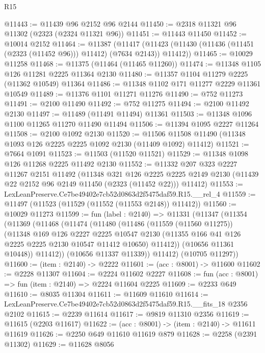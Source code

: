 \begin{lexlean}{R15}
\begin{coremodule}
@11443 := @11439 @96 @2152 @96 @2144
@11450 := @2318 @11321 @96 @11302 (@2323 (@2324 @11321 @96))
@11451 := @11443 @11450
@11452 := @10014 @2152
@11464 := @11387
    (@11417 (@11423 (@11430 (@11436 (@11451 (@2323 (@11452 @96))) @11412) (@7634 @2143)) @11412))
@11465 := @10029 @11258
@11468 := @11375 (@11464 (@11465 @11260))
@11474 := @11348 @1105 @126 @11281 @2225 @11364 @2130
@11480 := @11357 @1104 @11279 @2225 (@11362 @10549) @11364
@11486 := @11348 @1102 @171 @11277 @2229 @11361 @10549
@11489 := @11376 @1101 @11271 @11276
@11490 := @752 @11273
@11491 := @2100 @11490
@11492 := @752 @11275
@11494 := @2100 @11492 @2130
@11497 := @11489 (@11491 @11494) @11361
@11503 := @11348 @1096 @1100 @11265 @11270 @11490 @11494
@11506 := @11394 @1095 @2227 @11264
@11508 := @2100 @1092 @2130
@11520 := @11506 @11508 @11490 (@11348 @1093 @126 @2225 @2225 @1092 @2130 (@11409 @1092) @11412)
@11521 := @7664 @1091
@11523 := @11503 (@11520 @11521)
@11529 := @11348 @1098 @126 @11268 @2225 @11492 @2130
@11552 := @11332
    @207
    @323
    @2227
    @11267
    @2151
    @11492
    (@11348
      @321
      @126
      @2225
      @2225
      @2149
      @2130
      (@11439 @22 @2152 @96 @2149 @11450 (@2323 (@11452 @22)))
      @11412)
@11553 := LexLeanPreserve.Ce7be49402e7cb52d0863d2f5475daf59.R15.__rel_4
@11559 := @11497 (@11523 (@11529 (@11552 (@11553 @2148)) @11412))
@11560 := @10029 @11273
@11599 := fun (label : @2140) =>
  @11331
    (@11347
      (@11354
        (@11369
          (@11468
            (@11474
              (@11480
                (@11486
                  (@11559 (@11560 @11275))
                  (@11348
                    @169
                    @126
                    @2227
                    @2225
                    @10547
                    @2130
                    (@11355 @166 @41 @126 @2225 @2225 @2130 @10547 @11412 @10650)
                    @11412))
                (@10656 @11361 @10448))
              @11412))
          (@10656 @11337 @11339))
        @11412)
      (@10705 @11297))
@11600 := (item : @2140) -> @2222
@11601 := (acc : @8001) -> @11600
@11602 := @2228 @11307
@11604 := @2224 @11602 @2227
@11608 := fun (acc : @8001) => fun (item : @2140) => @2224 @11604 @2225
@11609 := @2233 @649
@11610 := @8035 @11304
@11611 := @11609 @11610
@11614 := LexLeanPreserve.Ce7be49402e7cb52d0863d2f5475daf59.R15.__fits_18 @2356 @2102
@11615 := @2239 @11614
@11617 := @9819 @11310 @2356
@11619 := @11615 (@2203 @11617)
@11622 := (acc : @8001) -> (item : @2140) -> @11611 @11619
@11626 := @2250 @649 @11610 @11619 @879
@11628 := @2258 (@2391 @11302)
@11629 := @11628 @8056

\end{coremodule}
\end{lexlean}
